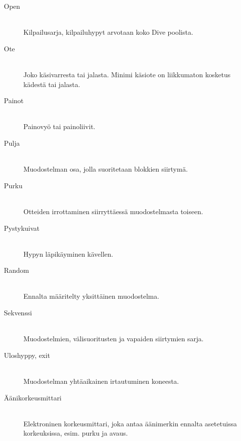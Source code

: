 \begin{description}
\item[Open ] \hfill \\ 
Kilpailusarja, kilpailuhypyt arvotaan koko Dive poolista. \hfill \\ 
\end{description}
\begin{description}
\item[Ote ] \hfill \\ 
Joko käsivarresta tai jalasta. Minimi käsiote on liikkumaton kosketus kädestä tai jalasta. \hfill \\ 
\end{description}
\begin{description}
\item[Painot ] \hfill \\ 
Painovyö tai painoliivit. \hfill \\ 
\end{description}
\begin{description}
\item[Pulja ] \hfill \\ 
Muodostelman osa, jolla suoritetaan blokkien siirtymä. \hfill \\ 
\end{description}
\begin{description}
\item[Purku ] \hfill \\ 
Otteiden irrottaminen siirryttäessä muodostelmasta toiseen. \hfill \\ 
\end{description}
\begin{description}
\item[Pystykuivat ] \hfill \\ 
Hypyn läpikäyminen kävellen. \hfill \\ 
\end{description}
\begin{description}
\item[Random ] \hfill \\ 
Ennalta määritelty yksittäinen muodostelma. \hfill \\ 
\end{description}
\begin{description}
\item[Sekvenssi ] \hfill \\ 
Muodostelmien, välisuoritusten ja vapaiden siirtymien sarja. \hfill \\ 
\end{description}
\begin{description}
\item[Uloshyppy, exit ] \hfill \\ 
Muodostelman yhtäaikainen irtautuminen koneesta. \hfill \\ 
\end{description}
\begin{description}
\item[Äänikorkeusmittari ] \hfill \\ 
Elektroninen korkeusmittari, joka antaa äänimerkin ennalta asetetuissa korkeuksissa, esim. purku ja avaus. \hfill \\ 
\end{description}
